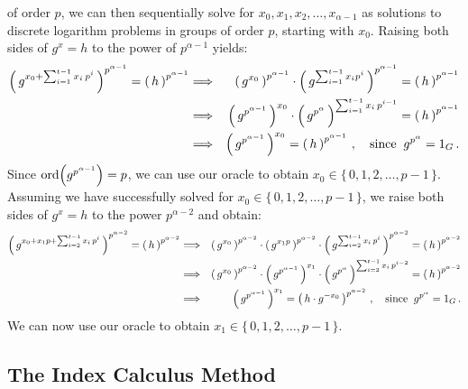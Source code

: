 \begin{itemize}
{		of order $p$, we can then sequentially solve for $x_{0}, x_{1}, x_{2},\ldots,x_{\alpha-1}$ as solutions
		to discrete logarithm problems in groups of order $p$, starting with $x_{0}$.
 		\vskip 0.1cm
		Raising both sides of $g^{x} = h$ to the power of $p^{\alpha-1}$ yields:
		\begin{eqnarray*}
		\left(\,g^{x_{0}+\sum_{i=1}^{t-1}x_{i}\,p^{i}}\,\right)^{p^{\alpha-1}}  = \left(\,h\,\right)^{p^{\alpha-1}}
		&\Longrightarrow& \left(\,g^{x_{0}}\,\right)^{p^{\alpha-1}}
				\cdot\left(\,g^{\sum_{i=1}^{t-1}x_{i}p^{i}}\,\right)^{p^{\alpha-1}}  = \left(\,h\,\right)^{p^{\alpha-1}} \\
		&\Longrightarrow& \left(\,g^{p^{\alpha-1}}\,\right)^{x_{0}}
				\cdot\left(\,g^{p^{\alpha}}\,\right)^{\sum_{i=1}^{t-1}x_{i}\,p^{i-1}}  = \left(\,h\,\right)^{p^{\alpha-1}} \\
		&\Longrightarrow& \left(\,g^{p^{\alpha-1}}\,\right)^{x_{0}} = \left(\,h\,\right)^{p^{\alpha-1}}\,,
			\quad\textnormal{since}\;\; g^{p^{\alpha}} = 1_{G}\,. \\
		\end{eqnarray*}
		Since $\textnormal{ord}\!\left(g^{p^{\alpha-1}}\right) = p$, we can use our oracle to obtain $x_{0} \in \{\,0,1,2,\ldots,p-1\,\}$.
		\vskip 0.1cm
		Assuming we have successfully solved for $x_{0} \in \{\,0,1,2,\ldots,p-1\,\}$, we raise both sides of $g^{x} = h$
		to the power $p^{\alpha-2}$ and obtain:
		\begin{eqnarray*}
		\left(\,g^{x_{0}+x_{1}p+\sum_{i=2}^{t-1}x_{i}\,p^{i}}\,\right)^{p^{\alpha-2}}  = \left(\,h\,\right)^{p^{\alpha-2}}
		&\Longrightarrow& \left(\,g^{x_{0}}\,\right)^{p^{\alpha-2}} \cdot \left(\,g^{x_{1}p}\,\right)^{p^{\alpha-2}}
				\cdot\left(\,g^{\sum_{i=2}^{t-1}x_{i}\,p^{i}}\,\right)^{p^{\alpha-2}}  = \left(\,h\,\right)^{p^{\alpha-2}} \\
		&\Longrightarrow& \left(\,g^{x_{0}}\,\right)^{p^{\alpha-2}} \cdot \left(\,g^{p^{\alpha-1}}\,\right)^{x_{1}}
				\cdot\left(\,g^{p^{\alpha}}\,\right)^{\sum_{i=2}^{t-1}x_{i}\,p^{i-2}}  = \left(\,h\,\right)^{p^{\alpha-2}} \\
		&\Longrightarrow& \left(\,g^{p^{\alpha-1}}\,\right)^{x_{1}} = \left(\,h\cdot g^{-x_{0}}\,\right)^{p^{\alpha-2}}\,,
			\quad\textnormal{since}\;\; g^{p^{\alpha}} = 1_{G}\,. \\
		\end{eqnarray*}
		We can now use our oracle to obtain $x_{1} \in \{\,0,1,2,\ldots,p-1\,\}$.
		}
\end{itemize}

\subsection{The Index Calculus Method}



